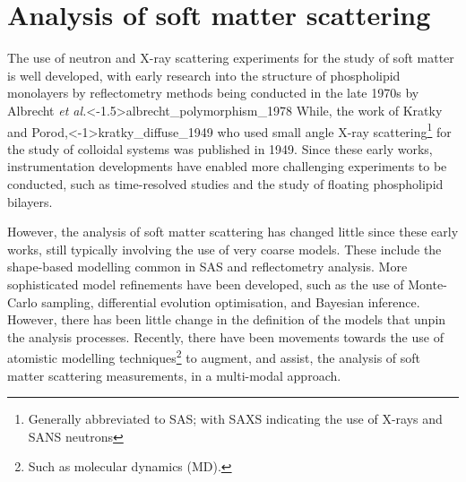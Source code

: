 \section{Analysis of soft matter scattering}
The use of neutron and X-ray scattering experiments for the study of soft matter is well developed, with early research into the structure of phospholipid monolayers by reflectometry methods being conducted in the late 1970s by Albrecht \emph{et al.}\sidecite<-1.5\baselineskip>{albrecht_polymorphism_1978}
While, the work of Kratky and Porod,\sidecite<-1\baselineskip>{kratky_diffuse_1949} who used small angle X-ray scattering\footnote{Generally abbreviated to SAS; with SAXS indicating the use of X-rays and SANS neutrons} for the study of colloidal systems was published in 1949.
Since these early works, instrumentation developments have enabled more challenging experiments to be conducted, such as time-resolved studies \autocite{jensen_monitoring_2014} and the study of floating phospholipid bilayers.\autocite{rondelli_reflectivity_2012}

However, the analysis of soft matter scattering has changed little since these early works, still typically involving the use of very coarse models.
These include the shape-based modelling common in SAS \autocite[][see Section~\ref{sec:sasanal}]{hassan_small_2003} and reflectometry analysis.\autocite[][see Section~\ref{sec:sasanal}]{campbell_structure_2018,lu_analysis_1996}
More sophisticated model refinements have been developed, such as the use of Monte-Carlo sampling,\autocite{pedersen_monte_2002} differential evolution optimisation,\autocite[abbreviated to DE]{wormington_characterization_1999} and Bayesian inference.\autocite{nelson_refnx_2019}
However, there has been little change in the definition of the models that unpin the analysis processes.
Recently, there have been movements towards the use of atomistic modelling techniques\footnote{Such as molecular dynamics (MD).} to augment, and assist, the analysis of soft matter scattering measurements, in a multi-modal approach.\autocite{scoppola_combining_2018}

